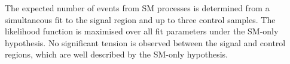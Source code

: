 
The expected number of events from SM processes is determined from a
simultaneous fit to the signal region and up to three control
samples. The likelihood function is maximised over all fit parameters
under the SM-only hypothesis.  
%
No significant tension is observed between the signal and control
regions, which are well described by the SM-only hypothesis.%

